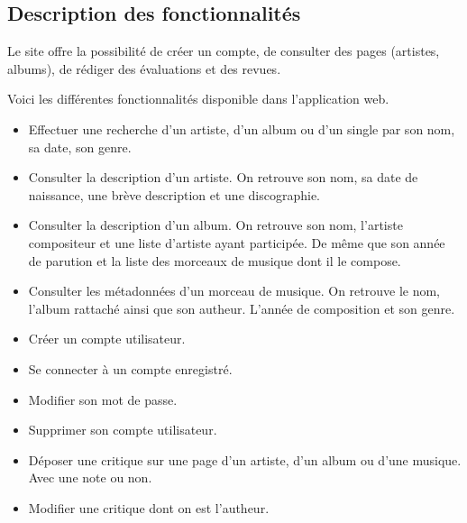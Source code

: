   \subsection{Description des fonctionnalités}

    \begin{paragraphe}
      	Le site offre la possibilité de créer un compte, de consulter des pages
        (artistes, albums), de rédiger des évaluations et des revues.
    \end{paragraphe}

    \begin{paragraphe}
      Voici les différentes fonctionnalités disponible dans l'application web.
    \end{paragraphe}

    \begin{paragraphe}
      \begin{itemize}
        \item Effectuer une recherche d'un artiste, d'un album ou d'un single
          par son nom, sa date, son genre.
        \item Consulter la description d'un artiste. On retrouve son nom, sa
          date de naissance, une brève description et une discographie.
        \item Consulter la description d'un album. On retrouve son nom,
          l'artiste compositeur et une liste d'artiste ayant participée. De
          même que son année de parution et la liste des morceaux de musique
          dont il le compose.
        \item Consulter les métadonnées d'un morceau de musique. On retrouve
          le nom, l'album rattaché ainsi que son autheur. L'année de composition
          et son genre.
      \end{itemize}
    \end{paragraphe}

    \begin{paragraphe}
      \begin{itemize}
        \item Créer un compte utilisateur.
        \item Se connecter à un compte enregistré.
        \item Modifier son mot de passe.
        \item Supprimer son compte utilisateur.
      \end{itemize}
    \end{paragraphe}

    \begin{paragraphe}
      \begin{itemize}
        \item Déposer une critique sur une page d'un artiste, d'un album ou
          d'une musique. Avec une note ou non.
        \item Modifier une critique dont on est l'autheur.
      \end{itemize}
    \end{paragraphe}

